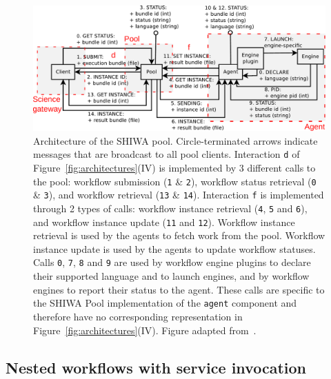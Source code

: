 \documentclass[preprint,3p,twocolumn]{elsarticle}
\begin{document}
{\begin{figure}
\centering
\includegraphics[width=1.5\columnwidth]{figures/pool-interactions.pdf}
\caption{Architecture of the SHIWA pool. Circle-terminated arrows
  indicate messages that are broadcast to all pool
  clients. Interaction \texttt{d} of Figure~\ref{fig:architectures}(IV) is
  implemented by 3 different calls to the pool: workflow
  submission (\texttt{1} \& \texttt{2}), workflow status retrieval
  (\texttt{0} \& \texttt{3}), and workflow
  retrieval (\texttt{13} \& \texttt{14}). Interaction
  \texttt{f} is implemented through 2 types of calls: workflow
  instance retrieval (\texttt{4}, \texttt{5} and \texttt{6}), and
  workflow instance update (\texttt{11} and \texttt{12}). Workflow
  instance retrieval is used by the agents to fetch work from the
  pool. Workflow instance update is used by the agents to update
  workflow statuses.  Calls \texttt{0}, \texttt{7}, \texttt{8} and
  \texttt{9} are used by
  workflow engine plugins to declare their supported language and to
  launch engines, and by workflow engines to report their status to
  the agent. These calls are specific to the SHIWA Pool implementation
  of the \texttt{agent} component and therefore have no corresponding
  representation in Figure~\ref{fig:architectures}(IV). Figure adapted
  from~\cite{ROGE-13}.}
\label{fig:shiwa-pool-architecture}
\end{figure}

\subsection{Nested workflows with service invocation}

}
\end{document}
